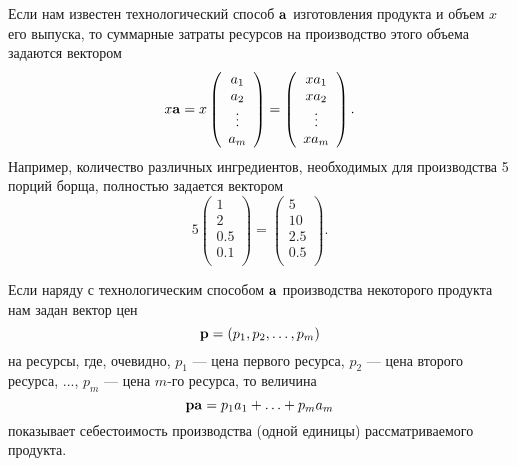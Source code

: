     Если нам известен технологический способ $\mathbf{a}$ изготовления
    продукта и объем $x$ его выпуска, то суммарные затраты ресурсов
    на производство этого объема задаются вектором
    \[x\mathbf{a}=x\left(
     \begin{array}{c}
        a_{1} \\
        a_{2} \\
        \vdots \\
        a_{m}  \\
      \end{array}
    \right)=
    \left(
     \begin{array}{c}
        xa_{1} \\
        xa_{2} \\
        \vdots \\
        xa_{m}  \\
      \end{array}
    \right).\]
    Например, количество различных ингредиентов,  необходимых
    для производства 5 порций борща, полностью задается вектором
    \[5\left(
     \begin{array}{c}
        1 \\
        2 \\
        0.5 \\
        0.1  \\
      \end{array}
    \right)=
    \left(
     \begin{array}{c}
        5 \\
        10 \\
        2.5 \\
        0.5  \\
      \end{array}
    \right).\]

    Если наряду с технологическим способом $\mathbf{a}$
    производства некоторого продукта нам задан вектор цен
    \[\mathbf{p}=(p_{1},p_{2},\ldots,p_{m})\]
    на ресурсы, где, очевидно, $p_{1}$ --- цена первого ресурса,
    $p_{2}$ --- цена второго ресурса, ..., $p_{m}$ --- цена $m$-го
    ресурса, то величина
    \[\mathbf{p}\mathbf{a}=p_{1}a_{1}+\ldots+p_{m}a_{m}\]
    показывает себестоимость производства (одной единицы)
    рассматриваемого продукта.


